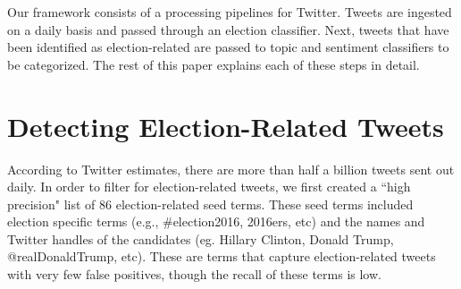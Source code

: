 \documentclass[letterpaper]{article}
\begin{document}
Our framework consists of a processing pipelines for Twitter. Tweets are ingested on a daily basis and passed through an election classifier. Next, tweets that have been identified as election-related are passed to topic and sentiment classifiers to be categorized. The rest of this paper explains each of these steps in detail. %














\section{Detecting Election-Related Tweets}
According to Twitter estimates, there are more than half a billion tweets sent out daily. In order to filter for election-related tweets, we first created a ``high precision" list of 86 election-related seed terms. These seed terms included election specific terms (e.g., \#election2016, 2016ers, etc) and the names and Twitter handles of the candidates (eg. Hillary Clinton, Donald Trump, @realDonaldTrump, etc). These are terms that capture election-related tweets with very few false positives, though the recall of these terms is low.
\end{document}
